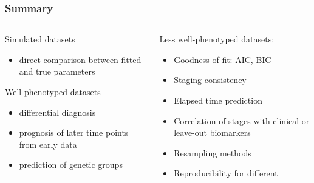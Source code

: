 \documentclass[10pt,xcolor=table]{beamer}
\begin{document}
\begin{frame}
\frametitle{Summary}

\begin{columns}[t, totalwidth=1.\textwidth]

  \begin{column}{0.47\linewidth}
      \begin{block}{Simulated datasets}
	  \begin{itemize}
	      \item \textcolor{parCol}{direct comparison between fitted and true parameters}
	  \end{itemize}
      \end{block}
      
      
      \begin{block}{Well-phenotyped datasets}
	  \begin{itemize}
	      \item \textcolor{bothCol}{differential diagnosis}
	      \item \textcolor{bothCol}{prognosis of later time points from early data}
	      \item \textcolor{bothCol}{prediction of genetic groups}
	  \end{itemize}
      \end{block}
      
  \end{column}

  \begin{column}{0.47\linewidth}
      \begin{block}{Less well-phenotyped datasets:}
	  \begin{itemize}
	      \item \textcolor{parCol}{Goodness of fit: AIC, BIC}
	      \item \textcolor{stCol}{Staging consistency}
	      \item \textcolor{stCol}{Elapsed time prediction}
	      \item \textcolor{stCol}{Correlation of stages with clinical or leave-out biomarkers}
	      \item \textcolor{bothCol}{Resampling methods}
	      \item \textcolor{bothCol}{Reproducibility for different}
	  \end{itemize}
      \end{block}
  \end{column}

\end{columns}



\end{frame}
\end{document}
